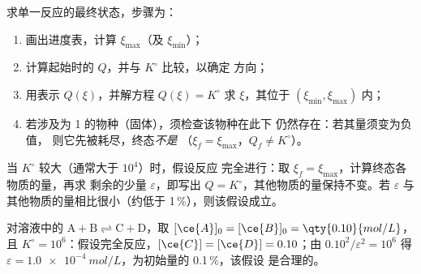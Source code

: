 \begin{method}[求最终状态]\label{met:b1:extent-q-and-k:final-state}
求单一反应的最终状态，步骤为：
\begin{enumerate}
  \item 画出进度表，计算 $\xi_{\max}$（及 $\xi_{\min}$）；
  \item 计算起始时的 $Q$，并与 $K^\circ$ 比较，以确定
        方向；
  \item 用表示 $Q(\xi)$，并解方程 $Q(\xi) = K^\circ$
        求 $\xi$，其位于 $(\xi_{\min}, \xi_{\max})$ 内；
  \item 若涉及为 1 的物种（固体），须检查该物种在此下
        仍然存在：若其量须变为负值，
        则它先被耗尽，终态\emph{不是}
        （$\xi_f = \xi_{\max}$，$Q_f \ne K^\circ$）。
\end{enumerate}
\end{method}

\begin{method}[定量反应假设]\label{met:b1:extent-q-and-k:quantitative}
当 $K^\circ$ 较大（通常大于 $10^4$）时，假设反应
完全进行：取 $\xi_f = \xi_{\max}$，计算终态各物质的量，再求
剩余的少量 $\varepsilon$，即写出 $Q =
K^\circ$，其他物质的量保持不变。若
$\varepsilon$ 与其他物质的量相比很小（约低于
1\,\%），则该假设成立。
\end{method}

\begin{example}[定量反应]\label{ex:b1:extent-q-and-k:quant}
对溶液中的 $\mathrm{A + B \rightleftharpoons C + D}$，取 $[\ce{A}]_0 = [\ce{B}]_0 =
\qty{0.10}{mol/L}$，且 $K^\circ = 10^6$：假设完全反应，$[\ce{C}]
= [\ce{D}] = 0.10$；由 $0.10^2/\varepsilon^2 = 10^6$ 得 $\varepsilon
= \qty{1.0e-4}{mol/L}$，为初始量的 0.1\,\%，该假设
是合理的。
\end{example}


